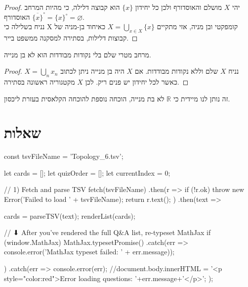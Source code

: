 \documentclass{tstextbook}
\begin{document}
\begin{proof}
יהי \(X\) מושלם והאוסדורף ולכן כל יחידון \(\{x\}\) הוא קבוצה דלילה, כי מהיות המרחב האוסדורף \(\overline{\{x\}}^{\circ}=\{x\}^{\circ}=\varnothing\).\\

נניח בשלילה כי X קומפקטי ובן מניה, אזי מתקיים \(X=\bigcup_{x\in X}\{x\}\) כאיחוד בן-מניה של קבוצות דלילות, בסתירה למסקנה ממשפט בייר.  

\end{proof}
\begin{corollary}
מרחב מטרי שלם בלי נקודות מבודדות הוא לא בן מנייה.

\end{corollary}
\begin{proof}
נניח \(X\) שלם וללא נקודות מבודדות. אם \(X\) היה בן מנייה ניתן לכתוב \(X=\bigcup_{n}x_{n}\) כאשר לכל יחידון יש פנים ריק. לכן \(X\) מקטגוריה ראשונה בסתירה.

\end{proof}
\begin{remark}
זה נותן לנו מיידית כי \(\mathbb{R}\) לא בת מנייה, הוכחה נוספת להוכחה הקלאסית בעזרת ליכסון.

\end{remark}
\section{שאלות}


    const tsvFileName = 'Topology_6.tsv';

    let cards = [];
    let quizOrder = [];
    let currentIndex = 0;

    // 1) Fetch and parse TSV
fetch(tsvFileName)
  .then(r => {
    if (!r.ok) throw new Error('Failed to load ' + tsvFileName);
    return r.text();
  })
  .then(text => {
    cards = parseTSV(text);
    renderList(cards);

    // ⬇ After you’ve rendered the full Q&A list, re-typeset MathJax
    if (window.MathJax) {
      MathJax.typesetPromise()
        .catch(err => console.error('MathJax typeset failed: ' + err.message));
    }
  })
  .catch(err => {
    console.error(err);
    //document.body.innerHTML =  '<p style="color:red">Error loading questions: '+err.message+'</p>';
  });
\end{document}
